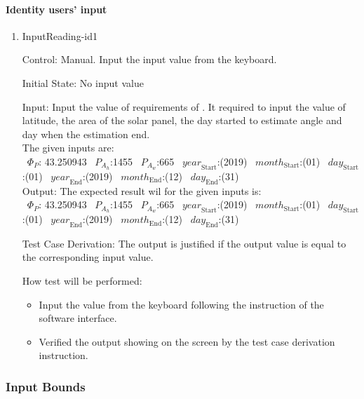 \documentclass[12pt, titlepage]{article}
\begin{document}
\paragraph{Identity users' input}
\begin{enumerate}

\item{InputReading-id1\\}

Control: Manual. Input the input value from the keyboard.
					
Initial State: No input value
					
Input: Input the value of requirements of \progname. It required to input the
value of latitude, the area of the solar panel, the day started to estimate
angle and day when the estimation end.\\

 The given inputs are:\\
 ~$\Phi_P$: 43.250943 
~$P_{A_{h}}$:1455
~$P_{A_{w}}$:665
~$\mathit{year}_\text{Start}$:(2019) ~$\mathit{month}_\text{Start}$:(01) 
~$\mathit{day}_\text{Start}$:(01) ~$\mathit{year}_\text{End}$:(2019) 
~$\mathit{month}_\text{End}$:(12) 
~$\mathit{day}_\text{End}$:(31)\\

 Output: The expected result wil for the given inputs is:\\ 
~$\Phi_P$: 43.250943
~$P_{A_{h}}$:1455
~$P_{A_{w}}$:665
~$\mathit{year}_\text{Start}$:(2019) 
~$\mathit{month}_\text{Start}$:(01) 
~$\mathit{day}_\text{Start}$:(01) 
~$\mathit{year}_\text{End}$:(2019) 
~$\mathit{month}_\text{End}$:(12) 
~$\mathit{day}_\text{End}$:(31)\\


Test Case Derivation: The output is justified if the output value is equal to
the corresponding input value.

How test will be performed:
\begin{itemize}
\item Input the value from the keyboard following the instruction of the
software interface.
\item Verified the output showing on the screen by the test case derivation
instruction. \end{itemize}
\end{enumerate}


\subsubsection{Input Bounds}
\end{document}
